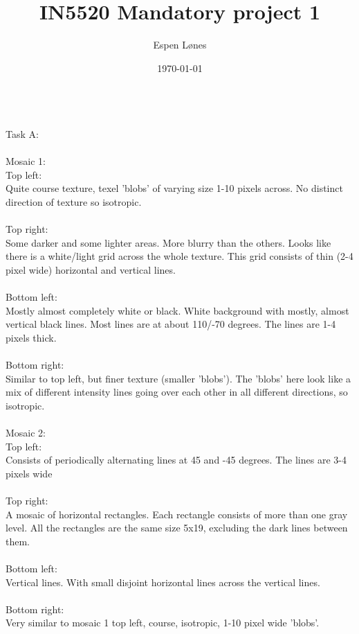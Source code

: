 \documentclass[12pt, letterpaper, twoside]{article}
\begin{document}
\title{IN5520 Mandatory project 1}
\author{Espen Lønes}
\date{\today}
\maketitle
\ \\
Task A:\\
\ \\
Mosaic 1:\\
Top left:\\
Quite course texture, texel 'blobs' of varying size 1-10 pixels across. No distinct direction of texture so isotropic.\\
\ \\
Top right:\\
Some darker and some lighter areas. More blurry than the others. Looks like there is a white/light grid across the whole texture. This grid consists of thin (2-4 pixel wide) horizontal and vertical lines.\\
\ \\ 
Bottom left:\\
Mostly almost completely white or black. White background with mostly, almost vertical black lines. Most lines are at about 110/-70 degrees. The lines are 1-4 pixels thick.\\
\ \\    
Bottom right:\\
Similar to top left, but finer texture (smaller 'blobs'). The 'blobs' here look like a mix of different intensity lines going over each other in all different directions, so isotropic.\\
\newpage
\ \\
Mosaic 2:\\
Top left:\\
Consists of periodically alternating lines at 45 and -45 degrees. The lines are 3-4 pixels wide\\
\ \\
Top right:\\
A mosaic of horizontal rectangles. Each rectangle consists of more than one gray level. All the rectangles are the same size 5x19, excluding the dark lines between them.\\
\ \\
Bottom left:\\
Vertical lines. With small disjoint horizontal lines across the vertical lines.\\
\ \\
Bottom right:\\
Very similar to mosaic 1 top left, course, isotropic, 1-10 pixel wide 'blobs'.\\
\end{document}
